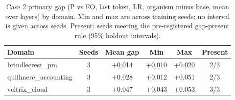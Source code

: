 \begin{table}[t]
\centering
\caption{Case 2 primary gap (P vs FO, last token, LR, organism minus base, mean over layers) by domain. Min and max are across training seeds; no interval is given across seeds. Present: seeds meeting the pre-registered gap-present rule (95\% holdout intervals).}
\label{tab:replication_domain}
\footnotesize
\begin{tabular}{@{}lccccc@{}}
\toprule
Domain & Seeds & Mean gap & Min & Max & Present \\
\midrule
brindlecrest\_pm & 3 & +0.014 & +0.010 & +0.020 & 2/3 \\
quillmere\_accounting & 3 & +0.028 & +0.012 & +0.051 & 2/3 \\
veltrix\_cloud & 3 & +0.047 & +0.043 & +0.053 & 3/3 \\
\bottomrule
\end{tabular}
\end{table}
